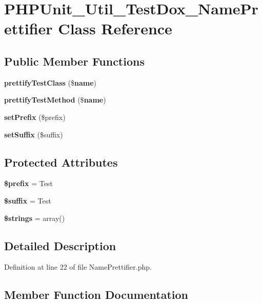 \section{P\+H\+P\+Unit\+\_\+\+Util\+\_\+\+Test\+Dox\+\_\+\+Name\+Prettifier Class Reference}
\label{class_p_h_p_unit___util___test_dox___name_prettifier}
\subsection*{Public Member Functions}
\begin{DoxyCompactItemize}
\item 
{\bf prettify\+Test\+Class} (\${\bf name})
\item 
{\bf prettify\+Test\+Method} (\${\bf name})
\item 
{\bf set\+Prefix} (\$prefix)
\item 
{\bf set\+Suffix} (\$suffix)
\end{DoxyCompactItemize}
\subsection*{Protected Attributes}
\begin{DoxyCompactItemize}
\item 
{\bf \$prefix} = \textquotesingle{}Test\textquotesingle{}
\item 
{\bf \$suffix} = \textquotesingle{}Test\textquotesingle{}
\item 
{\bf \$strings} = array()
\end{DoxyCompactItemize}


\subsection{Detailed Description}


Definition at line 22 of file Name\+Prettifier.\+php.



\subsection{Member Function Documentation}
